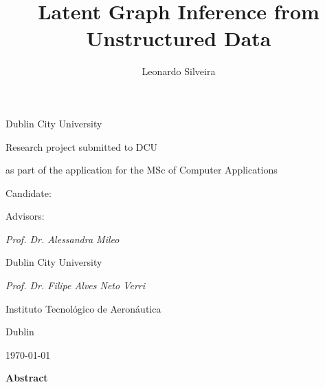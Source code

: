 \documentclass[12pt,a4paper]{article}
\title{Latent Graph Inference from Unstructured Data}
\author{Leonardo Silveira}
\begin{document}
	
	\makeatletter
	\begin{titlepage}
		{\centering Dublin City University\par}
		\vspace{1.2cm}
		
		{\centering\Large\scshape \@title\par}
		\vspace{1cm}
		
		{\centering Research project submitted to DCU\par}
		{\centering as part of the application for the MSc of Computer Applications \par}
		\vspace{1cm}
		
		{\centering Candidate:\par}
		{\centering\large\itshape \@author\par}
		\vspace{1cm}

		{\centering Advisors:\par}
		\vspace{0.2cm}
		{\centering\large\itshape Prof. Dr. Alessandra Mileo\par}
		{\centering Dublin City University\par}

		 \vspace{0.8cm}
		{\centering\large\itshape Prof. Dr. Filipe Alves Neto Verri\par}
		{\centering Instituto Tecnológico de Aeronáutica\par}
		
		\vfill
		{\centering Dublin\par}
		{\centering \today \par}
		
	\end{titlepage}
	
	\makeatother
	
	\tableofcontents
	\clearpage
	
	
	
	{\centering\large\bfseries Abstract\par}
	\vspace{0.5cm}
	
	
\end{document}
